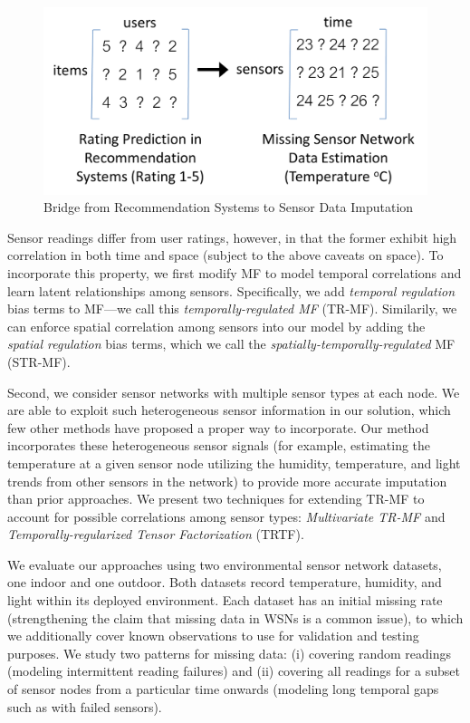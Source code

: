 \begin{figure}[H]
\centering
\includegraphics[scale=0.35]{recommend_imputation.png}
\caption{Bridge from Recommendation Systems to Sensor Data Imputation} 
\label{recommend_imputation}
\end{figure}

Sensor readings differ from user ratings, however, in that the former
exhibit high correlation in both time and space (subject to the above
caveats on space).  To incorporate this property, we first modify MF
to model temporal correlations and learn latent relationships among
sensors.  Specifically, we add {\em temporal regulation} bias terms to
MF---we call this {\em temporally-regulated MF} (TR-MF). Similarily, we can enforce spatial correlation among sensors into our model by adding the {\em spatial regulation} bias terms, which we call the {\em spatially-temporally-regulated} MF (STR-MF).

Second, we consider sensor networks with multiple sensor types at each node.
We are able to exploit such heterogeneous sensor information in our
solution, which few other methods have proposed a proper way to
incorporate.  Our method incorporates these heterogeneous sensor
signals (for example, estimating the temperature at a given sensor
node utilizing the humidity, temperature, and light trends from other
sensors in the network) to provide more accurate imputation than 
prior approaches.  We present two techniques for extending 
TR-MF to account for possible correlations among sensor types: {\em Multivariate TR-MF} and 
{\em Temporally-regularized Tensor Factorization} (TRTF).

We evaluate our approaches using two environmental sensor network
datasets, one indoor and one outdoor.
Both datasets record temperature, humidity, and light within its deployed
environment.  Each dataset has an initial missing rate (strengthening
the claim that missing data in WSNs is a common issue), to which we
additionally cover known observations to use for validation and
testing purposes.  We study two patterns for missing data: (i) covering
random readings (modeling intermittent reading failures) and (ii)
covering all readings for a subset of sensor nodes from a particular time onwards 
(modeling long temporal gaps such as with failed sensors).

